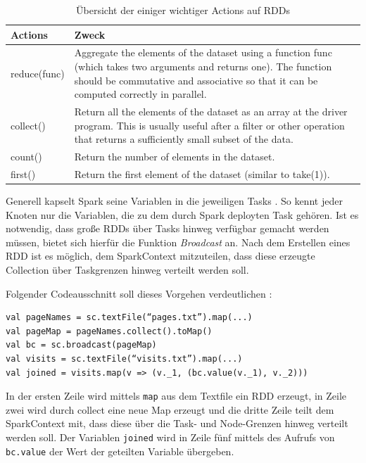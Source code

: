 \begin{table}[!ht]
\centering
\begin{tabular}{| p{5cm} | p{8cm} | }
\hline
Actions & Zweck \\ \hline \hline
reduce(func) & Aggregate the elements of the dataset using a function func (which takes two arguments and returns one). The function should be commutative and associative so that it can be computed correctly in parallel.  \\ \hline 
collect() & Return all the elements of the dataset as an array at the driver program. This is usually useful after a filter or other operation that returns a sufficiently small subset of the data. \\ \hline 
count() & Return the number of elements in the dataset. \\ \hline 
first() & Return the first element of the dataset (similar to take(1)). \\ \hline 
\end{tabular}
\caption{Übersicht der einiger wichtiger Actions auf RDDs}
	\label{tab:actions}
\end{table}



Generell kapselt Spark seine Variablen in die jeweiligen Tasks . So kennt jeder Knoten nur die Variablen, die zu dem durch Spark deployten Task gehören. Ist es notwendig, dass große RDDs über Tasks hinweg verfügbar gemacht werden müssen, bietet sich hierfür die Funktion \textit{Broadcast} an. Nach dem Erstellen eines RDD ist es möglich, dem SparkContext mitzuteilen, dass diese erzeugte Collection über Taskgrenzen hinweg verteilt werden soll. 

Folgender Codeausschnitt soll dieses Vorgehen verdeutlichen : 

\begin{lstlisting}[label=broadcast,caption=Verwendung der Broadcast-Variablen in Spark]
val pageNames = sc.textFile(“pages.txt”).map(...)
val pageMap = pageNames.collect().toMap()
val bc = sc.broadcast(pageMap)
val visits = sc.textFile(“visits.txt”).map(...)
val joined = visits.map(v => (v._1, (bc.value(v._1), v._2)))
\end{lstlisting}

In der ersten Zeile wird mittels \texttt{map} aus dem Textfile ein RDD erzeugt, in Zeile zwei wird durch collect eine neue Map erzeugt und die dritte Zeile teilt dem SparkContext mit, dass diese über die Task- und Node-Grenzen hinweg verteilt werden soll. Der Variablen \texttt{joined} wird in Zeile fünf mittels des Aufrufs von \texttt{bc.value} der Wert der geteilten Variable übergeben.



